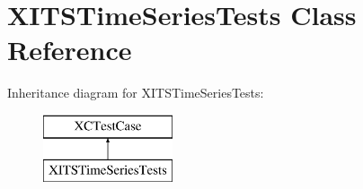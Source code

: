 \hypertarget{interface_x_i_t_s_time_series_tests}{}\section{X\+I\+T\+S\+Time\+Series\+Tests Class Reference}
\label{interface_x_i_t_s_time_series_tests}
Inheritance diagram for X\+I\+T\+S\+Time\+Series\+Tests\+:\begin{figure}[H]
\begin{center}
\leavevmode
\includegraphics[height=2.000000cm]{interface_x_i_t_s_time_series_tests}
\end{center}
\end{figure}
